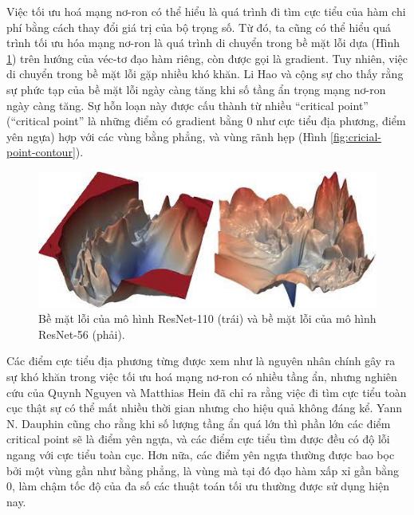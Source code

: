 Việc tối ưu hoá mạng nơ-ron có thể hiểu là quá trình đi tìm cực tiểu của hàm chi phí bằng cách thay đổi giá trị của bộ trọng số. Từ đó, ta cũng có thể hiểu quá trình tối ưu hóa mạng nơ-ron là quá trình di chuyển trong bề mặt lỗi dựa (Hình \ref{fig:resnet-loss}) trên hướng của véc-tơ đạo hàm riêng, còn được gọi là gradient. Tuy nhiên, việc di chuyển trong bề mặt lỗi gặp nhiều khó khăn. Li Hao và cộng sự\cite{li2018visualizing} cho thấy rằng sự phức tạp của bề mặt lỗi ngày càng tăng khi số tầng ẩn trọng mạng nơ-ron ngày càng tăng. Sự hỗn loạn này được cấu thành từ nhiều ``critical point'' (``critical point'' là những điểm có gradient bằng 0 như cực tiểu địa phương, điểm yên ngựa) hợp với các vùng bằng phẳng, và vùng rãnh hẹp (Hình \ref{fig:cricial-point-contour}).

\begin{figure}[htp]
	\centering
	\includegraphics[width=120 mm]{images/resnet-loss.png}
	\caption{Bề mặt lỗi của mô hình ResNet-110 (trái) và bề mặt lỗi của mô hình ResNet-56 (phải).\cite{li2018visualizing}}
	\label{fig:resnet-loss}
\end{figure}

Các điểm cực tiểu địa phương từng được xem như là nguyên nhân chính gây ra sự khó khăn trong việc tối ưu hoá mạng nơ-ron có nhiều tầng ẩn, nhưng nghiên cứu của Quynh Nguyen và Matthias Hein\cite{nguyen2017thelosssurface} đã chỉ ra rằng việc đi tìm cực tiểu toàn cục thật sự có thể mất nhiều thời gian nhưng cho hiệu quả không đáng kể. Yann N. Dauphin cũng cho rằng khi số lượng tầng ẩn quá lớn thì phần lớn các điểm critical point sẽ là điểm yên ngựa, và các điểm cực tiểu tìm được đều có độ lỗi ngang với cực tiểu toàn cục. Hơn nữa, các điểm yên ngựa thường được bao bọc bởi một vùng gần như bằng phẳng, là vùng mà tại đó đạo hàm xấp xỉ gần bằng 0, làm chậm tốc độ của đa số các thuật toán tối ưu thường được sử dụng hiện nay.


